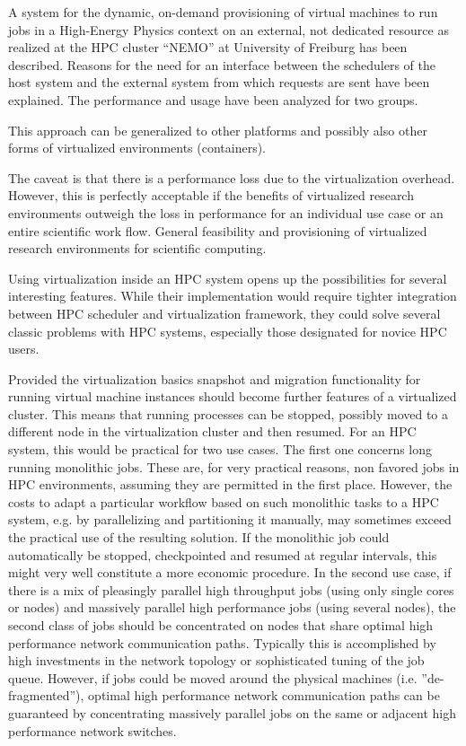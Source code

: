 A system for the dynamic, on-demand provisioning of virtual machines to run jobs
in a High-Energy Physics context on an external, not dedicated resource as
realized at the HPC cluster ``NEMO'' at University of Freiburg has been
described.  Reasons for the need for an interface between the schedulers of the
host system and the external system from which requests are sent have been
explained.  The performance and usage have been analyzed for two groups. 

This approach can be generalized to other platforms and possibly also other
forms of virtualized environments (containers).

The caveat is that there is a performance loss due to the virtualization
overhead. However, this is perfectly acceptable if the benefits of virtualized
research environments outweigh the loss in performance for an individual use
case or an entire scientific work flow. General feasibility and provisioning of
virtualized research environments for scientific computing.

Using virtualization inside an HPC system opens up the possibilities for several
interesting features. While their implementation would require tighter
integration between HPC scheduler and virtualization framework, they could solve
several classic problems with HPC systems, especially those designated for
novice HPC users. 

Provided the virtualization basics snapshot and migration functionality for
running virtual machine instances should become further features of a
virtualized cluster. This means that running processes can be stopped, possibly
moved to a different node in the virtualization cluster and then resumed. For an
HPC system, this would be practical for two use cases. The first one concerns
long running monolithic jobs. These are, for very practical reasons, non favored
jobs in HPC environments, assuming they are permitted in the first place.
However, the costs to adapt a particular workflow based on such monolithic tasks
to a HPC system, e.g. by parallelizing and partitioning it manually, may
sometimes exceed the practical use of the resulting solution. If the monolithic
job could automatically be stopped, checkpointed and resumed at regular
intervals, this might very well constitute a more economic procedure. In the
second use case, if there is a mix of pleasingly parallel high throughput jobs
(using only single cores or nodes) and massively parallel high performance jobs
(using several nodes), the second class of jobs should be concentrated on nodes
that share optimal high performance network communication paths. Typically this
is accomplished by high investments in the network topology or sophisticated
tuning of the job queue. However, if jobs could be moved around the physical
machines (i.e. ”de-fragmented”), optimal high performance network communication
paths can be guaranteed by concentrating massively parallel jobs on the same or
adjacent high performance network switches.

